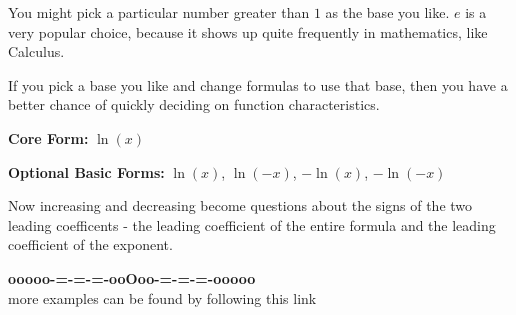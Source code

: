 \documentclass{ximera}
\begin{document}
You might pick a particular number greater than $1$ as the base you like.  $e$ is a very popular choice, because it shows up quite frequently in mathematics, like Calculus. 











If you pick a base you like and change formulas to use that base, then you have a better chance of quickly deciding on function characteristics. 



\textbf{\textcolor{blue!55!black}{Core Form:}}  $\ln(x)$ 



\textbf{\textcolor{blue!55!black}{Optional Basic Forms:}}  $\ln(x)$, $\ln(-x)$, $-\ln(x)$, $-\ln(-x)$ 


Now increasing and decreasing become questions about the signs of the two leading coefficents - the leading coefficient of the entire formula and the leading coefficient of the exponent.












\begin{center}
\textbf{\textcolor{green!50!black}{ooooo-=-=-=-ooOoo-=-=-=-ooooo}} \\

more examples can be found by following this link\\ 

\end{center}
\end{document}
